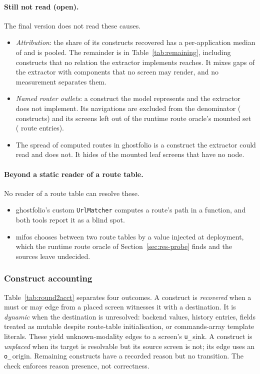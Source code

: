 \paragraph{Still not read (open).} The final version does not read these causes.

\begin{itemize}
\item \emph{Attribution}: the share of its constructs recovered has a per-application median of
\AttrRecoveredMedian{} and is \AttrRecoveredShare{} pooled. The remainder is in
Table~\ref{tab:remaining}, including constructs that no relation the extractor implements reaches. It mixes gaps of the extractor with
components that no screen may render, and no measurement separates them.
\item \emph{Named router outlets}: a construct the model represents and the extractor does not
implement. Its navigations are excluded from the denominator (\RoundTwoExcludedOutlet{} constructs) and
its screens left out of the runtime route oracle's mounted set (\ProbeOutletScreens{} route
entries).
\item The spread of computed routes in ghostfolio is a construct the extractor could read and does
not. It hides \ProbeMissedGhostfolio{} of the \ProbeMissed{} mounted leaf screens that have no node.
\end{itemize}

\paragraph{Beyond a static reader of a route table.} No reader of a route table can resolve these.

\begin{itemize}
\item ghostfolio's custom \texttt{UrlMatcher} computes a route's path in a function, and both tools report it as a blind spot.
\item mifos chooses between two route tables by a value injected at deployment, which the runtime
route oracle of Section~\ref{sec:res-probe} finds and the sources leave undecided.
\end{itemize}

\subsubsection{Construct accounting}
\label{sec:res-accounting}

Table~\ref{tab:round2acct} separates four outcomes. A construct is \emph{recovered} when a must or may
edge from a placed screen witnesses it with a destination. It is \emph{dynamic} when the destination
is unresolved: backend values, history entries, fields treated as mutable despite route-table
initialisation, or commands-array template literals. These yield
unknown-modality edges to a screen's \texttt{u\_}\,sink. A construct is \emph{unplaced} when its target
is resolvable but its source screen is not; its edge uses an \texttt{o\_}\,origin. Remaining constructs
have a recorded reason but no transition. The check enforces reason presence, not correctness.

